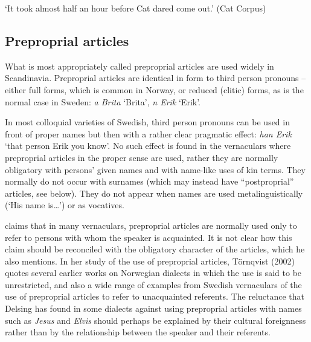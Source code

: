 \begin{styleTranslation}
‘It took almost half an hour before Cat dared come out.’ (Cat Corpus)

\end{styleTranslation}

\subsection{\rmfamily Preproprial articles}
\label{bkm:Ref224379496}
\begin{styleBodyTextFirst}
What is most appropriately called preproprial articles are used widely in Scandinavia. Preproprial articles are identical in form to third person pronouns – either full forms, which is common in Norway, or reduced (clitic) forms, as is the normal case in Sweden: \textit{a Brita} ‘Brita’, \textit{n Erik }‘Erik’. 

\end{styleBodyTextFirst}

\begin{styleBodytextC}
In most colloquial varieties of Swedish, third person pronouns can be used in front of proper names but then with a rather clear pragmatic effect: \textit{han Erik} ‘that person Erik you know’. No such effect is found in the vernaculars where preproprial articles in the proper sense are used, rather they are normally obligatory with persons’ given names and with name-like uses of kin terms. They normally do not occur with surnames (which may instead have “postproprial” articles, see below). They do not appear when names are used metalinguistically (‘His name is…’) or as vocatives. 

\end{styleBodytextC}

\begin{styleBodytextC}
\citet[21]{Delsing2003a} claims that in many vernaculars, preproprial articles are normally used only to refer to persons with whom the speaker is acquainted. It is not clear how this claim should be reconciled with the obligatory character of the articles, which he also mentions. In her study of the use of preproprial articles, Törnqvist (2002) quotes several earlier works on Norwegian dialects in which the use is said to be unrestricted, and also a wide range of examples from Swedish vernaculars of the use of preproprial articles to refer to unacquainted referents. The reluctance that Delsing has found in some dialects against using preproprial articles with names such as \textit{Jesus} and \textit{Elvis} should perhaps be explained by their cultural foreignness rather than by the relationship between the speaker and their referents. 

\end{styleBodytextC}

